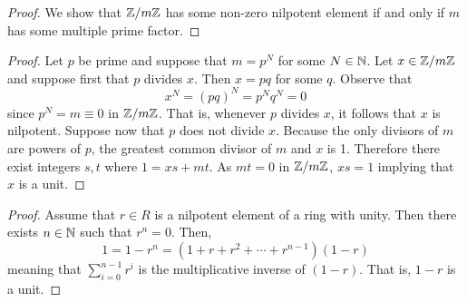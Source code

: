 \documentclass[../AlgebraQualSolutions.tex]{subfiles}
\begin{document}
\begin{proof}
    We show that $\mathbb{Z}/m\mathbb{Z}$ has some non-zero nilpotent element if and only if $m$ has some multiple prime factor.
\end{proof}

\begin{proof}
    Let $p$ be prime and suppose that $m = p^N$ for some $N \in \mathbb{N}$. Let $x \in \mathbb{Z}/m\mathbb{Z}$ and suppose first that $p$ divides $x$. Then $x = pq$ for some $q$. Observe that
        \[x^N = (pq)^N = p^Nq^N = 0\]
    since $p^N = m \equiv 0$ in $\mathbb{Z}/m\mathbb{Z}$. That is, whenever $p$ divides $x$, it follows that $x$ is nilpotent. Suppose now that $p$ does not divide $x$. Because the only divisors of $m$ are powers of $p$, the greatest common divisor of $m$ and $x$ is 1. Therefore there exist integers $s,t$ where $1 = xs + mt$. As $mt = 0$ in $\mathbb{Z}/m\mathbb{Z}$, $xs = 1$ implying that $x$ is a unit.
\end{proof}

\begin{proof}
    Assume that $r \in R$ is a nilpotent element of a ring with unity. Then there exists $n \in \mathbb{N}$ such that $r^n = 0$. Then,
        \[1 = 1 - r^n = (1 + r + r^2 + \cdots + r^{n-1})(1-r)\]
    meaning that $\sum_{i=0}^{n-1}r^i$ is the multiplicative inverse of $(1-r)$. That is, $1-r$ is a unit.
\end{proof}
\end{document}

